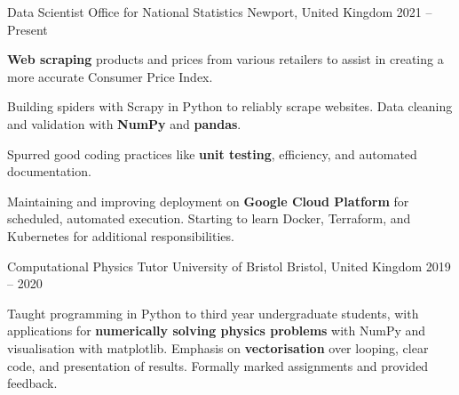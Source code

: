 
\begin{cventries}

    \cventry
        {Data Scientist} %
        {Office for National Statistics} %
        {Newport, United Kingdom} %
        {2021 -- Present} %
        {
            \begin{cvitems} %
                \item{\textbf{Web scraping} products and prices from various retailers to assist in creating a more accurate Consumer Price Index.}
                \item{Building spiders with Scrapy in Python to reliably scrape websites. Data cleaning and validation with \textbf{NumPy} and \textbf{pandas}.}
                \item{Spurred good coding practices like \textbf{unit testing}, efficiency, and automated documentation.}
                \item{Maintaining and improving deployment on \textbf{Google Cloud Platform} for scheduled, automated execution. Starting to learn Docker, Terraform, and Kubernetes for additional responsibilities.}
            \end{cvitems}
        }

    \cventry
        {Computational Physics Tutor} %
        {University of Bristol} %
        {Bristol, United Kingdom} %
        {2019 -- 2020} %
        {
            \begin{cvitems} %
                \item{Taught programming in Python to third year undergraduate students, with applications for \textbf{numerically solving physics problems} with NumPy and visualisation with matplotlib. Emphasis on \textbf{vectorisation} over looping, clear code, and presentation of results. Formally marked assignments and provided feedback.}
            \end{cvitems}
        }


\end{cventries}

